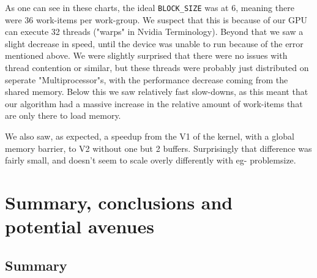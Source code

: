 \documentclass[a4paper,english,12pt,twoside=false]{scrartcl} %
\begin{document}
As one can see in these charts, the ideal \verb|BLOCK_SIZE| was at 6, meaning there were 36 work-items per work-group.
We suspect that this is because of our GPU can execute 32 threads ("warps" in Nvidia Terminology).
Beyond that we saw a slight decrease in speed, until the device was unable to run because of the error mentioned above.
We were slightly surprised that there were no issues with thread contention or similar, but these threads were probably just distributed on seperate "Multiprocessor"s, with the performance decrease coming from the shared memory.
Below this we saw relatively fast slow-downs, as this meant that our algorithm had a massive increase in the relative amount of work-items that are only there to load memory.

We also saw, as expected, a speedup from the V1 of the kernel, with a global memory barrier, to V2 without one but 2 buffers. Surprisingly that difference was fairly small, and doesn't seem to scale overly differently with eg- problemsize.

\section{Summary, conclusions and potential avenues}
\subsection{Summary}
\label{chap:summary}
\end{document}
